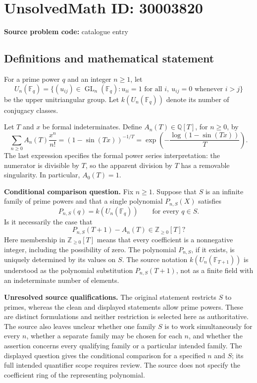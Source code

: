 \documentclass[11pt]{article}
\newcommand{\Z}{\mathbb{Z}}
\newcommand{\Q}{\mathbb{Q}}
\newcommand{\F}{\mathbb{F}}
\begin{document}
\section*{UnsolvedMath ID: 30003820}
\textbf{Source problem code:} catalogue entry
\subsection{Definitions and mathematical statement}
For a prime power \(q\) and an integer \(n\geq 1\), let
\[
U_n(\F_q)=\{(u_{ij})\in\operatorname{GL}_n(\F_q):u_{ii}=1\text{ for all }i,\ u_{ij}=0\text{ whenever }i>j\}
\]
be the upper unitriangular group. Let \(k(U_n(\F_q))\) denote its number of conjugacy classes.

Let \(T\) and \(x\) be formal indeterminates. Define \(A_n(T)\in\Q[T]\), for \(n\geq0\), by
\[
\sum_{n\geq0}A_n(T)\frac{x^n}{n!}
=(1-\sin(Tx))^{-1/T}
=\exp\!\left(-\frac{\log(1-\sin(Tx))}{T}\right).
\]
The last expression specifies the formal power series interpretation: the numerator is divisible by \(T\), so the apparent division by \(T\) has a removable singularity. In particular, \(A_0(T)=1\).

\textbf{Conditional comparison question.} Fix \(n\geq1\). Suppose that \(S\) is an infinite family of prime powers and that a single polynomial \(P_{n,S}(X)\) satisfies
\[
P_{n,S}(q)=k(U_n(\F_q))\qquad\text{for every }q\in S.
\]
Is it necessarily the case that
\[
P_{n,S}(T+1)-A_n(T)\in\Z_{\geq0}[T]?
\]
Here membership in \(\Z_{\geq0}[T]\) means that every coefficient is a nonnegative integer, including the possibility of zero. The polynomial \(P_{n,S}\), if it exists, is uniquely determined by its values on \(S\). The source notation \(k(U_n(\F_{T+1}))\) is understood as the polynomial substitution \(P_{n,S}(T+1)\), not as a finite field with an indeterminate number of elements.

\textbf{Unresolved source qualifications.} The original statement restricts \(S\) to primes, whereas the clean and displayed statements allow prime powers. These are distinct formulations and neither restriction is selected here as authoritative. The source also leaves unclear whether one family \(S\) is to work simultaneously for every \(n\), whether a separate family may be chosen for each \(n\), and whether the assertion concerns every qualifying family or a particular intended family. The displayed question gives the conditional comparison for a specified \(n\) and \(S\); its full intended quantifier scope requires review. The source does not specify the coefficient ring of the representing polynomial.
\end{document}
